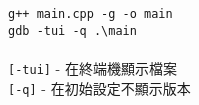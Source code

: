 \lstinline[]|g++ main.cpp -g -o main| \\
\lstinline[]|gdb -tui -q .\main| \\ \\
\verb|[-tui]| - 在終端機顯示檔案 \\
\verb|[-q]| - 在初始設定不顯示版本 \\